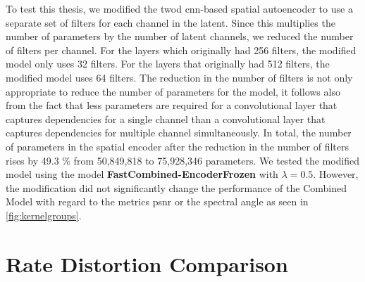 To test this thesis, we modified the \ac{twod} \ac{cnn}-based spatial autoencoder to use a separate set of filters for each channel in the latent. Since this multiplies the number of parameters by the number of latent channels, we reduced the number of filters per channel. For the layers which originally had 256 filters, the modified model only uses 32 filters. For the layers that originally had 512 filters, the modified model uses 64 filters. The reduction in the number of filters is not only appropriate to reduce the number of parameters for the model, it follows also from the fact that less parameters are required for a convolutional layer that captures dependencies for a single channel than a convolutional layer that captures dependencies for multiple channel simultaneously. In total, the number of parameters in the spatial encoder after the reduction in the number of filters rises by 49.3 \% from 50,849,818 to 75,928,346 parameters. We tested the modified model using the model \textbf{FastCombined-EncoderFrozen} with $\lambda=0.5$. However, the modification did not significantly change the performance of the Combined Model with regard to the metrics \ac{psnr} or the spectral angle as seen in \autoref{fig:kernelgroups}. 

\section{Rate Distortion Comparison\label{sec:ch5heur}}

